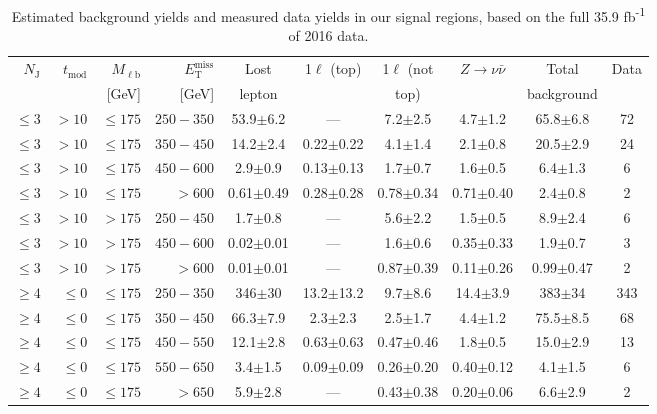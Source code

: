 \begin{table}[htbp]
\footnotesize
\centering
\caption{Estimated background yields and measured data yields in our
  signal regions, based on the full 35.9 fb\textsuperscript{-1} of
  2016 data.}
\label{tab:stop:results}
\begin{tabular}{|r|r|r|r|c|c|c|c|c|c|}
\hline
 \multirow{2}{*}{$N_\mathrm{J}$} & \multirow{2}{*}{$t_\mathrm{mod}$} & $M_\mathrm{\ell b}$ & $E_\mathrm{T}^\mathrm{miss}$ & Lost  & \multirow{2}{*}{1$\ell$ (top)} & 1$\ell$ (not & \multirow{2}{*}{$Z\rightarrow\nu\bar{\nu}$} & Total & \multirow{2}{*}{Data} \\
  &  &  [GeV] &  [GeV] &  lepton &  &  top) &  & background &  \\
\hline
$\leq3$ &    $>10$ & $\leq175$ & $250-350$ & 53.9$\pm$6.2 & --- & 7.2$\pm$2.5 & 4.7$\pm$1.2 & 65.8$\pm$6.8 & 72 \\
$\leq3$ &    $>10$ & $\leq175$ & $350-450$ & 14.2$\pm$2.4 & 0.22$\pm$0.22 & 4.1$\pm$1.4 & 2.1$\pm$0.8 & 20.5$\pm$2.9 & 24 \\
$\leq3$ &    $>10$ & $\leq175$ & $450-600$ & 2.9$\pm$0.9 & 0.13$\pm$0.13 & 1.7$\pm$0.7 & 1.6$\pm$0.5 & 6.4$\pm$1.3 & 6 \\
$\leq3$ &    $>10$ & $\leq175$ &    $>600$ & 0.61$\pm$0.49 & 0.28$\pm$0.28 & 0.78$\pm$0.34 & 0.71$\pm$0.40 & 2.4$\pm$0.8 & 2 \\
\hline
$\leq3$ &    $>10$ &     $>175$ & $250-450$ & 1.7$\pm$0.8 & --- & 5.6$\pm$2.2 & 1.5$\pm$0.5 & 8.9$\pm$2.4 & 6 \\
$\leq3$ &    $>10$ &     $>175$ & $450-600$ & 0.02$\pm$0.01 & --- & 1.6$\pm$0.6 & 0.35$\pm$0.33 & 1.9$\pm$0.7 & 3 \\
$\leq3$ &    $>10$ &     $>175$ &    $>600$ & 0.01$\pm$0.01 & --- & 0.87$\pm$0.39 & 0.11$\pm$0.26 & 0.99$\pm$0.47 & 2 \\
\hline
$\geq4$ & $\leq0$ & $\leq175$ & $250-350$ & 346$\pm$30 & 13.2$\pm$13.2 & 9.7$\pm$8.6 & 14.4$\pm$3.9 & 383$\pm$34 & 343 \\
$\geq4$ & $\leq0$ & $\leq175$ & $350-450$ & 66.3$\pm$7.9 & 2.3$\pm$2.3 & 2.5$\pm$1.7 & 4.4$\pm$1.2 & 75.5$\pm$8.5 & 68 \\
$\geq4$ & $\leq0$ & $\leq175$ & $450-550$ & 12.1$\pm$2.8 & 0.63$\pm$0.63 & 0.47$\pm$0.46 & 1.8$\pm$0.5 & 15.0$\pm$2.9 & 13 \\
$\geq4$ & $\leq0$ & $\leq175$ & $550-650$ & 3.4$\pm$1.5 & 0.09$\pm$0.09 & 0.26$\pm$0.20 & 0.40$\pm$0.12 & 4.1$\pm$1.5 & 6 \\
$\geq4$ & $\leq0$ & $\leq175$ &    $>650$ & 5.9$\pm$2.8 & --- & 0.43$\pm$0.38 & 0.20$\pm$0.06 & 6.6$\pm$2.9 & 2 \\

\end{tabular}
\end{table}
